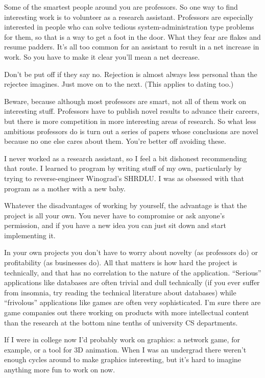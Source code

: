 \documentclass[12pt]{book}
\begin{document}
Some of the smartest people around you are professors. So one way to
find interesting work is to volunteer as a research assistant.
Professors are especially interested in people who can solve tedious
system-administration type problems for them, so that is a way to get a
foot in the door. What they fear are flakes and resume padders. It's all
too common for an assistant to result in a net increase in work. So you
have to make it clear you'll mean a net decrease.

Don't be put off if they say no. Rejection is almost always less
personal than the rejectee imagines. Just move on to the next. (This
applies to dating too.)

Beware, because although most professors are smart, not all of them work
on interesting stuff. Professors have to publish novel results to
advance their careers, but there is more competition in more interesting
areas of research. So what less ambitious professors do is turn out a
series of papers whose conclusions are novel because no one else cares
about them. You're better off avoiding these.

I never worked as a research assistant, so I feel a bit dishonest
recommending that route. I learned to program by writing stuff of my
own, particularly by trying to reverse-engineer Winograd's SHRDLU. I was
as obsessed with that program as a mother with a new baby.

Whatever the disadvantages of working by yourself, the advantage is that
the project is all your own. You never have to compromise or ask
anyone's permission, and if you have a new idea you can just sit down
and start implementing it.

In your own projects you don't have to worry about novelty (as
professors do) or profitability (as businesses do). All that matters is
how hard the project is technically, and that has no correlation to the
nature of the application. ``Serious'' applications like databases are
often trivial and dull technically (if you ever suffer from insomnia,
try reading the technical literature about databases) while
``frivolous'' applications like games are often very sophisticated. I'm
sure there are game companies out there working on products with more
intellectual content than the research at the bottom nine tenths of
university CS departments.

If I were in college now I'd probably work on graphics: a network game,
for example, or a tool for 3D animation. When I was an undergrad there
weren't enough cycles around to make graphics interesting, but it's hard
to imagine anything more fun to work on now.
\end{document}
